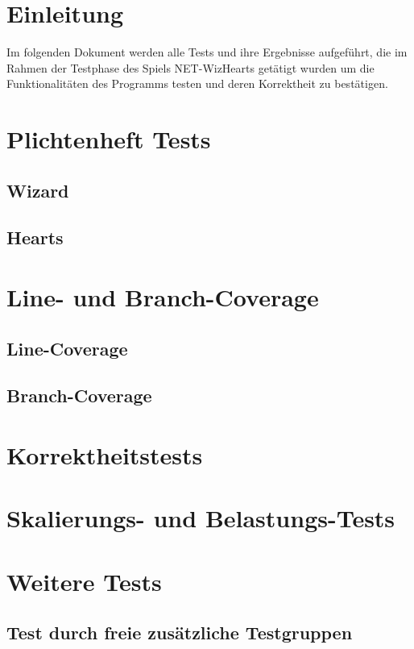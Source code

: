 \documentclass[titlepage,10pt,a4paper]{article}
\begin{document}
\newpage
 
\section{Einleitung}
Im folgenden Dokument werden alle Tests und ihre Ergebnisse aufgeführt, die im Rahmen der Testphase des Spiels NET-WizHearts getätigt wurden um die Funktionalitäten des Programms testen und deren Korrektheit zu bestätigen.
\section{Plichtenheft Tests}
	\subsection{Wizard}
	\subsection{Hearts}
\section{Line- und Branch-Coverage}
	\subsection{Line-Coverage}
	\subsection{Branch-Coverage}
\section{Korrektheitstests}
\section{Skalierungs- und Belastungs-Tests}
\section{Weitere Tests}
	\subsection{Test durch freie zusätzliche Testgruppen}

\newpage
\printglossaries
\end{document}
